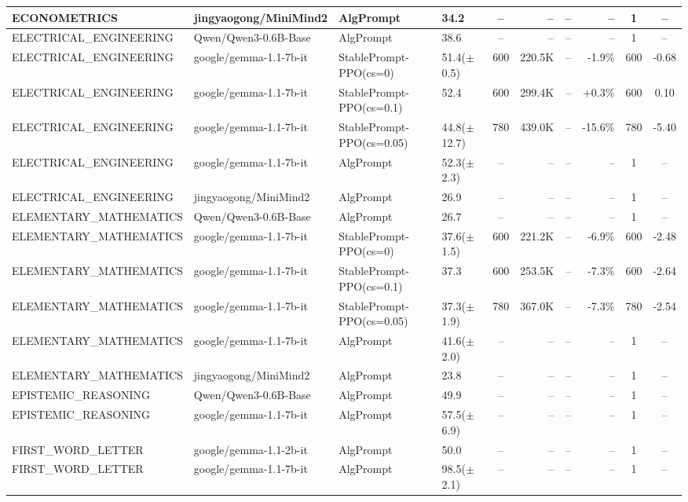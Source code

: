 {\begin{longtable}{@{}p{5.5cm}p{4.5cm}p{2.5cm}lcrrrcc@{}}
\midrule
ECONOMETRICS & jingyaogong/MiniMind2 & AlgPrompt & 34.2 & -- & -- & -- & -- & 1 & -- \\
\midrule
ELECTRICAL\_ENGINEERING & Qwen/Qwen3-0.6B-Base & AlgPrompt & 38.6 & -- & -- & -- & -- & 1 & -- \\
\midrule
ELECTRICAL\_ENGINEERING & google/gemma-1.1-7b-it & StablePrompt-PPO(cs=0) & 51.4($\pm$0.5) & 600 & 220.5K & -- & -1.9\% & 600 & -0.68 \\
ELECTRICAL\_ENGINEERING & google/gemma-1.1-7b-it & StablePrompt-PPO(cs=0.1) & 52.4 & 600 & 299.4K & -- & +0.3\% & 600 & 0.10 \\
ELECTRICAL\_ENGINEERING & google/gemma-1.1-7b-it & StablePrompt-PPO(cs=0.05) & 44.8($\pm$12.7) & 780 & 439.0K & -- & -15.6\% & 780 & -5.40 \\
ELECTRICAL\_ENGINEERING & google/gemma-1.1-7b-it & AlgPrompt & 52.3($\pm$2.3) & -- & -- & -- & -- & 1 & -- \\
\midrule
ELECTRICAL\_ENGINEERING & jingyaogong/MiniMind2 & AlgPrompt & 26.9 & -- & -- & -- & -- & 1 & -- \\
\midrule
ELEMENTARY\_MATHEMATICS & Qwen/Qwen3-0.6B-Base & AlgPrompt & 26.7 & -- & -- & -- & -- & 1 & -- \\
\midrule
ELEMENTARY\_MATHEMATICS & google/gemma-1.1-7b-it & StablePrompt-PPO(cs=0) & 37.6($\pm$1.5) & 600 & 221.2K & -- & -6.9\% & 600 & -2.48 \\
ELEMENTARY\_MATHEMATICS & google/gemma-1.1-7b-it & StablePrompt-PPO(cs=0.1) & 37.3 & 600 & 253.5K & -- & -7.3\% & 600 & -2.64 \\
ELEMENTARY\_MATHEMATICS & google/gemma-1.1-7b-it & StablePrompt-PPO(cs=0.05) & 37.3($\pm$1.9) & 780 & 367.0K & -- & -7.3\% & 780 & -2.54 \\
ELEMENTARY\_MATHEMATICS & google/gemma-1.1-7b-it & AlgPrompt & 41.6($\pm$2.0) & -- & -- & -- & -- & 1 & -- \\
\midrule
ELEMENTARY\_MATHEMATICS & jingyaogong/MiniMind2 & AlgPrompt & 23.8 & -- & -- & -- & -- & 1 & -- \\
\midrule
EPISTEMIC\_REASONING & Qwen/Qwen3-0.6B-Base & AlgPrompt & 49.9 & -- & -- & -- & -- & 1 & -- \\
\midrule
EPISTEMIC\_REASONING & google/gemma-1.1-7b-it & AlgPrompt & 57.5($\pm$6.9) & -- & -- & -- & -- & 1 & -- \\
\midrule
FIRST\_WORD\_LETTER & google/gemma-1.1-2b-it & AlgPrompt & 50.0 & -- & -- & -- & -- & 1 & -- \\
\midrule
FIRST\_WORD\_LETTER & google/gemma-1.1-7b-it & AlgPrompt & 98.5($\pm$2.1) & -- & -- & -- & -- & 1 & -- \\

\end{longtable}}
